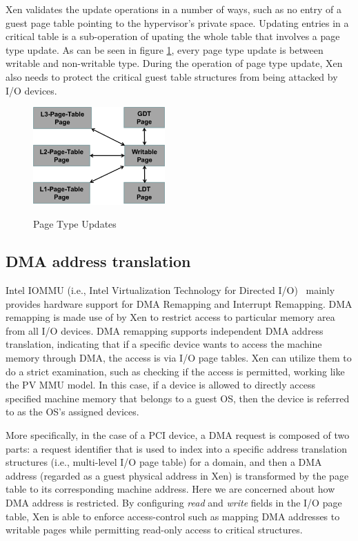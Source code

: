 Xen validates the update operations in a number of ways, such as no entry of a guest page table pointing to the hypervisor's private space. Updating entries in a critical table is a sub-operation of upating the whole table that involves a page type update. As can be seen in figure \ref{fig:page-type-updates}, every page type update is between writable and non-writable type. During the operation of page type update, Xen also needs to protect the critical guest table structures from being attacked by I/O devices.

\begin{figure}[ht]
\centering
\includegraphics[width=0.45\textwidth]{image/background/page-type-updates.png} \\
\caption{Page Type Updates}
\label{fig:page-type-updates}
\end{figure}

\subsection{DMA address translation}

Intel IOMMU (i.e., Intel Virtualization Technology for Directed I/O)~\cite{intelvt} mainly provides hardware support for DMA Remapping and Interrupt Remapping. DMA remapping is made use of by Xen to restrict access to particular memory area from all I/O devices. DMA remapping supports independent DMA address translation, indicating that if a specific device wants to access the machine memory through DMA, the access is via I/O page tables. Xen can utilize them to do a strict examination, such as checking if the access is permitted, working like the PV MMU model. In this case, if a device is allowed to directly access specified machine memory that belongs to a guest OS, then the device is referred to as the OS's assigned devices.

More specifically, in the case of a PCI device, a DMA request is composed of two parts: a request identifier that is used to index into a specific address translation structures (i.e., multi-level I/O page table) for a domain, and then a DMA address (regarded as a guest physical address in Xen) is transformed by the page table to its corresponding machine address. Here we are concerned about how DMA address is restricted. By configuring \emph{read} and \emph{write} fields in the I/O page table, Xen is able to enforce access-control such as mapping DMA addresses to writable pages while permitting read-only access to critical structures.


